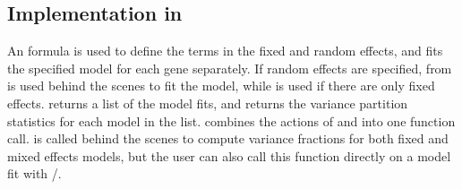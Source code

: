 \documentclass[12pt]{article}\usepackage[]{graphicx}\usepackage[]{xcolor}
\begin{document}
\subsection{Implementation in \R{}}

 An \R{} formula is used to define the terms in the fixed and random effects, and  fits the specified model for each gene separately.  If random effects are specified,  from  is used behind the scenes to fit the model, while  is used if there are only fixed effects.  returns a list of the model fits, and  returns the variance partition statistics for each model in the list.   combines the actions of  and  into one function call.   is called behind the scenes to compute variance fractions for both fixed and mixed effects models, but the user can also call this function directly on a model fit with /.
\end{document}
